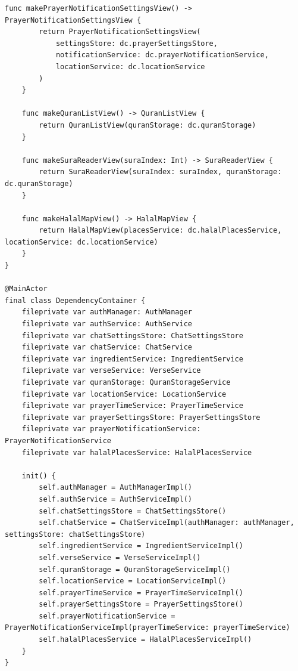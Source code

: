 \begin{lstlisting}[basicstyle=\tiny\ttfamily,breaklines=true]
    func makePrayerNotificationSettingsView() -> PrayerNotificationSettingsView {
        return PrayerNotificationSettingsView(
            settingsStore: dc.prayerSettingsStore,
            notificationService: dc.prayerNotificationService,
            locationService: dc.locationService
        )
    }

    func makeQuranListView() -> QuranListView {
        return QuranListView(quranStorage: dc.quranStorage)
    }

    func makeSuraReaderView(suraIndex: Int) -> SuraReaderView {
        return SuraReaderView(suraIndex: suraIndex, quranStorage: dc.quranStorage)
    }

    func makeHalalMapView() -> HalalMapView {
        return HalalMapView(placesService: dc.halalPlacesService, locationService: dc.locationService)
    }
}

@MainActor
final class DependencyContainer {
    fileprivate var authManager: AuthManager
    fileprivate var authService: AuthService
    fileprivate var chatSettingsStore: ChatSettingsStore
    fileprivate var chatService: ChatService
    fileprivate var ingredientService: IngredientService
    fileprivate var verseService: VerseService
    fileprivate var quranStorage: QuranStorageService
    fileprivate var locationService: LocationService
    fileprivate var prayerTimeService: PrayerTimeService
    fileprivate var prayerSettingsStore: PrayerSettingsStore
    fileprivate var prayerNotificationService: PrayerNotificationService
    fileprivate var halalPlacesService: HalalPlacesService

    init() {
        self.authManager = AuthManagerImpl()
        self.authService = AuthServiceImpl()
        self.chatSettingsStore = ChatSettingsStore()
        self.chatService = ChatServiceImpl(authManager: authManager, settingsStore: chatSettingsStore)
        self.ingredientService = IngredientServiceImpl()
        self.verseService = VerseServiceImpl()
        self.quranStorage = QuranStorageServiceImpl()
        self.locationService = LocationServiceImpl()
        self.prayerTimeService = PrayerTimeServiceImpl()
        self.prayerSettingsStore = PrayerSettingsStore()
        self.prayerNotificationService = PrayerNotificationServiceImpl(prayerTimeService: prayerTimeService)
        self.halalPlacesService = HalalPlacesServiceImpl()
    }
}
\end{lstlisting}

